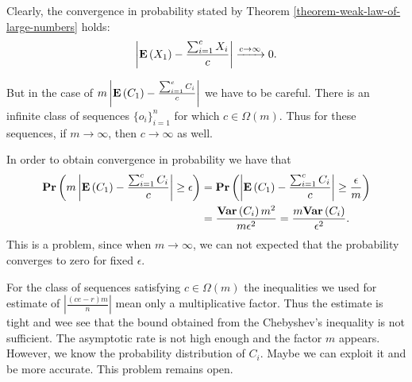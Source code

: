 Clearly, the convergence in probability stated by Theorem \ref{theorem-weak-law-of-large-numbers} holds:
\[
	\left|\mathbf{E}\left(X_1\right) - \frac{\sum\displaylimits_{i = 1}^{c} X_i}{c}\right| \xrightarrow{c \rightarrow \infty} 0 \text{.}
\]

But in the case of $m \left|\mathbf{E}\left(C_1\right) - \frac{\sum\displaylimits_{i = 1}^{c} C_i}{c}\right|$ we have to be careful. There is an infinite class of sequences $\{o_i\}_{i = 1}^{n}$ for which $c \in \Omega(m)$. Thus for these sequences, if $m \rightarrow \infty$, then $c \rightarrow \infty$ as well.

In order to obtain convergence in probability we have that
\[
\begin{split}
\mathbf{Pr}\left(m \left|\mathbf{E}\left(C_1\right) - \frac{\sum\displaylimits_{i = 1}^{c} C_i}{c}\right| \geq \epsilon\right) 
	& = \mathbf{Pr}\left(\left|\mathbf{E}\left(C_1\right) - \frac{\sum\displaylimits_{i = 1}^{c} C_i}{c}\right| \geq \frac{\epsilon}{m}\right)  \\
	& = \frac{\mathbf{Var}\left(C_i\right) m ^ 2}{m \epsilon ^ 2} = \frac{m\mathbf{Var}\left(C_i\right)}{\epsilon ^ 2} \text{.}
\end{split}
\]
This is a problem, since when $m \rightarrow \infty$, we can not expected that the probability converges to zero for fixed $\epsilon$. 

 For the class of sequences satisfying $c \in \Omega(m)$ the inequalities we used for estimate of $\left|\frac{(ce - r)m}{n}\right|$ mean only a multiplicative factor. Thus the estimate is tight and wee see that the bound obtained from the Chebyshev's inequality is not sufficient. The asymptotic rate is not high enough and the factor $m$ appears. However, we know the probability distribution of $C_i$. Maybe we can exploit it and be more accurate. This problem remains open.



